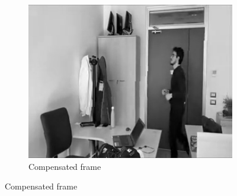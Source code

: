 \begin{figure}[htbp]
\begin{subfigure}[b]{0.3\textwidth}
        \includegraphics[width=1\textwidth]{../assets/images/04-compensated.png}
        \caption{Compensated frame}
        \label{fig:compensated}
    \end{subfigure}
    

\end{figure}
